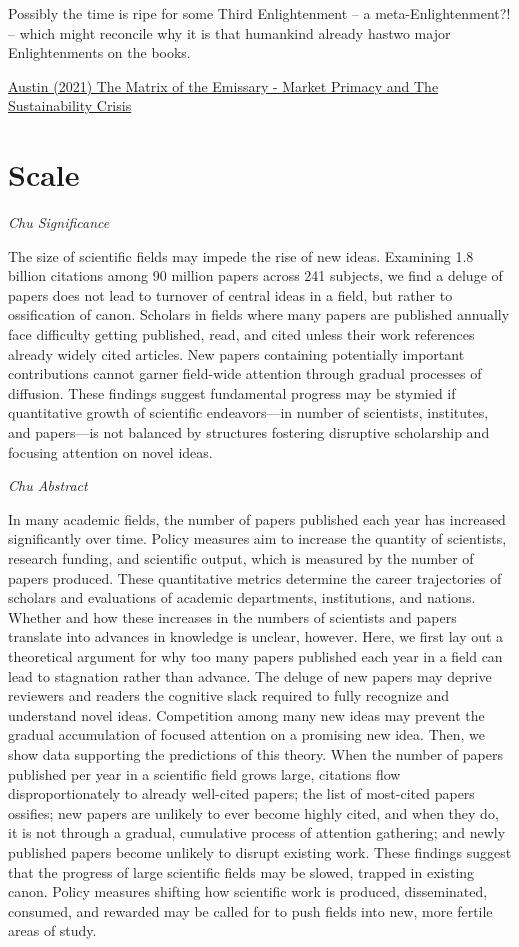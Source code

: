 \documentclass[
]{book}
\begin{document}
Possibly the time is ripe for some Third Enlightenment -- a meta-Enlightenment?! -- which might reconcile why it is that humankind already hastwo major Enlightenments on the books.

\href{https://channelmcgilchrist.com/articles/the-matrix-of-the-emissary/}{Austin (2021) The Matrix of the Emissary - Market Primacy and The Sustainability Crisis}

\hypertarget{scale}{%
\section{Scale}\label{scale}}

\emph{Chu Significance}

The size of scientific fields may impede the rise of new ideas. Examining 1.8 billion citations among 90 million papers across 241 subjects, we find a deluge of papers does not lead to turnover of central ideas in a field, but rather to ossification of canon. Scholars in fields where many papers are published annually face difficulty getting published, read, and cited unless their work references already widely cited articles. New papers containing potentially important contributions cannot garner field-wide attention through gradual processes of diffusion. These findings suggest fundamental progress may be stymied if quantitative growth of scientific endeavors---in number of scientists, institutes, and papers---is not balanced by structures fostering disruptive scholarship and focusing attention on novel ideas.

\emph{Chu Abstract}

In many academic fields, the number of papers published each year has increased significantly over time. Policy measures aim to increase the quantity of scientists, research funding, and scientific output, which is measured by the number of papers produced. These quantitative metrics determine the career trajectories of scholars and evaluations of academic departments, institutions, and nations. Whether and how these increases in the numbers of scientists and papers translate into advances in knowledge is unclear, however. Here, we first lay out a theoretical argument for why too many papers published each year in a field can lead to stagnation rather than advance. The deluge of new papers may deprive reviewers and readers the cognitive slack required to fully recognize and understand novel ideas. Competition among many new ideas may prevent the gradual accumulation of focused attention on a promising new idea. Then, we show data supporting the predictions of this theory. When the number of papers published per year in a scientific field grows large, citations flow disproportionately to already well-cited papers; the list of most-cited papers ossifies; new papers are unlikely to ever become highly cited, and when they do, it is not through a gradual, cumulative process of attention gathering; and newly published papers become unlikely to disrupt existing work. These findings suggest that the progress of large scientific fields may be slowed, trapped in existing canon. Policy measures shifting how scientific work is produced, disseminated, consumed, and rewarded may be called for to push fields into new, more fertile areas of study.
\end{document}
